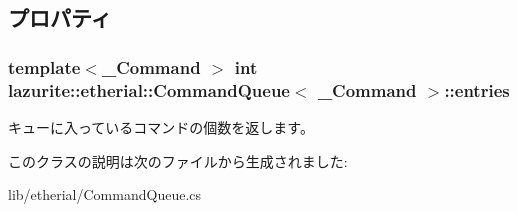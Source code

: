 \subsection{プロパティ}
\hypertarget{classlazurite_1_1etherial_1_1_command_queue_3_01___command_01_4_a03b2406d483ebbdfdced30c44e5c3265}{
\subsubsection[{entries}]{\setlength{\rightskip}{0pt plus 5cm}template$<$\_\-Command $>$ int lazurite::etherial::CommandQueue$<$ \_\-Command $>$::entries}}
\label{classlazurite_1_1etherial_1_1_command_queue_3_01___command_01_4_a03b2406d483ebbdfdced30c44e5c3265}
キューに入っているコマンドの個数を返します。 

このクラスの説明は次のファイルから生成されました:\begin{DoxyCompactItemize}
\item 
lib/etherial/CommandQueue.cs\end{DoxyCompactItemize}
